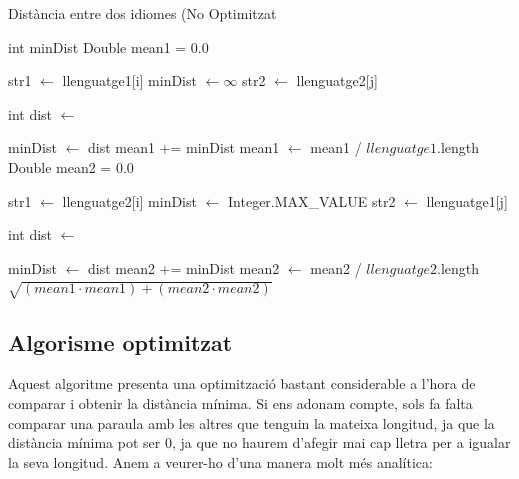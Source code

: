 \documentclass[conference]{IEEEtran}
\begin{document}
 \begin{algorithm}
     \caption{Distància entre dos idiomes (No Optimitzat}
 
 \begin{algorithmic}
    \State
    \State int minDist
    \State Double mean1 = 0.0
    
        \State str1 $\gets$ llenguatge1[i]
        \State minDist $\gets \infty $
            \State str2 $\gets$ llenguatge2[j]
        
            \State int dist $\gets$ 
            
                \State minDist $\gets$ dist
            \EndIf
        \EndFor
        \State
        \State mean1 += minDist
    \EndFor
    \State mean1 $\gets$ mean1 / $llenguatge1$.length
    \State
    \State Double mean2 = 0.0

        \State str1 $\gets$ llenguatge2[i]
        \State minDist $\gets$ Integer.MAX\_VALUE
            \State str2 $\gets$ llenguatge1[j]
           
            \State int dist $\gets$ 
            
                \State minDist $\gets$ dist
            \EndIf
        \EndFor
        \State
        \State mean2 += minDist
    \EndFor
    \State mean2 $\gets$ mean2 / $llenguatge2$.length
    \State
    \State \Return $\sqrt{(mean1 \cdot mean1) + (mean2 \cdot mean2)}$
\EndFunction
\end{algorithmic}
\end{algorithm}

 \subsection{Algorisme optimitzat}
    Aquest algoritme presenta una optimització bastant considerable a l'hora de comparar i obtenir la distància mínima. Si ens adonam compte, sols fa falta comparar una paraula amb les altres que tenguin la mateixa longitud, ja que la distància mínima pot ser 0, ja que no haurem d'afegir mai cap lletra per a igualar la seva longitud. Anem a veurer-ho d'una manera molt més analítica:
\end{document}

